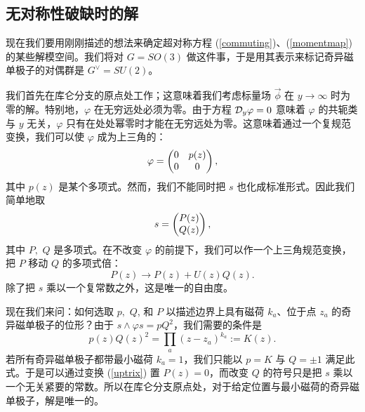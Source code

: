\subsection{无对称性破缺时的解}\label{solutions}

现在我们要用刚刚描述的想法来确定超对称方程 (\ref{commuting})、(\ref{momentmap}) 的某些解模空间。我们将对 $G=SO(3)$ 做这件事，于是用其表示来标记奇异磁单极子的对偶群是 $G^\vee=SU(2)$。

我们首先在库仑分支的原点处工作；这意味着我们考虑标量场 $\vec\phi$ 在 $y\to\infty$ 时为零的解。特别地，$\varphi$ 在无穷远处必须为零。由于方程 ${\mathcal D}_y\varphi=0$ 意味着 $\varphi$ 的共轭类与 $y$ 无关，$\varphi$ 只有在处处幂零时才能在无穷远处为零。这意味着通过一个复规范变换，我们可以使 $\varphi$ 成为上三角的：
\begin{equation}\label{uptri}\varphi=\begin{pmatrix} 0 & p(z) \cr 0 & 0 \end{pmatrix},\end{equation}
其中 $p(z)$ 是某个多项式。然而，我们不能同时把 $s$ 也化成标准形式。因此我们简单地取
\begin{equation}\label{nuptrix}s=\begin{pmatrix} P(z)\cr Q(z)\end{pmatrix},\end{equation}
其中 $P,$ $Q$ 是多项式。在不改变 $\varphi$ 的前提下，我们可以作一个上三角规范变换，把 $P$ 移动 $Q$ 的多项式倍：
\begin{equation}\label{uptrix} P(z)\to P(z)+U(z) Q(z).\end{equation}
除了把 $s$ 乘以一个复常数之外，这是唯一的自由度。

现在我们来问：如何选取 $p, $ $Q$, 和 $P$ 以描述边界上具有磁荷 $k_a$、位于点 $z_a$ 的奇异磁单极子的位形？由于 $s\wedge \varphi s = pQ^2$，我们需要的条件是
\begin{equation}\label{factors}
p(z) Q(z)^2 = \prod_a(z - z_a)^{k_a} := K(z).
\end{equation}
若所有奇异磁单极子都带最小磁荷 $k_a=1$，我们只能以 $p=K$ 与 $Q=\pm 1$ 满足此式。于是可以通过变换 (\ref{uptrix}) 置 $P(z)=0$，而改变 $Q$ 的符号只是把 $s$ 乘以一个无关紧要的常数。所以在库仑分支原点处，对于给定位置与最小磁荷的奇异磁单极子，解是唯一的。

